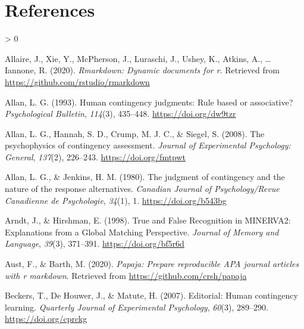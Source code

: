 \documentclass[
  english,
  man,floatsintext]{apa6}
\newlength{\cslhangindent}
\newenvironment{CSLReferences}[2] %
 {%
  \setlength{\parindent}{0pt}
  \ifodd #1 \everypar{\setlength{\hangindent}{\cslhangindent}}\ignorespaces\fi
  \ifnum #2 > 0
  \setlength{\parskip}{#2\baselineskip}
  \fi
 }%
 {}
\begin{document}
\newpage

\hypertarget{references}{%
\section{References}\label{references}}

\begingroup
\setlength{\parindent}{-0.5in}
\setlength{\leftskip}{0.5in}

\hypertarget{refs}{}
\begin{CSLReferences}{1}{0}
\leavevmode\hypertarget{ref-R-rmarkdown}{}%
Allaire, J., Xie, Y., McPherson, J., Luraschi, J., Ushey, K., Atkins, A., \ldots{} Iannone, R. (2020). \emph{Rmarkdown: Dynamic documents for r}. Retrieved from \url{https://github.com/rstudio/rmarkdown}

\leavevmode\hypertarget{ref-allanHumanContingencyJudgments1993}{}%
Allan, L. G. (1993). Human contingency judgments: {Rule} based or associative? \emph{Psychological Bulletin}, \emph{114}(3), 435--448. \url{https://doi.org/dw9tzr}

\leavevmode\hypertarget{ref-allanPsychophysicsContingencyAssessment2008}{}%
Allan, L. G., Hannah, S. D., Crump, M. J. C., \& Siegel, S. (2008). The psychophysics of contingency assessment. \emph{Journal of Experimental Psychology: General}, \emph{137}(2), 226--243. \url{https://doi.org/fmtpwt}

\leavevmode\hypertarget{ref-allanJudgmentContingencyNature1980}{}%
Allan, L. G., \& Jenkins, H. M. (1980). The judgment of contingency and the nature of the response alternatives. \emph{Canadian Journal of Psychology/Revue Canadienne de Psychologie}, \emph{34}(1), 1. \url{https://doi.org/b543bg}

\leavevmode\hypertarget{ref-arndtTrueFalseRecognition1998}{}%
Arndt, J., \& Hirshman, E. (1998). True and {False Recognition} in {MINERVA2}: {Explanations} from a {Global Matching Perspective}. \emph{Journal of Memory and Language}, \emph{39}(3), 371--391. \url{https://doi.org/bf5r6d}

\leavevmode\hypertarget{ref-R-papaja}{}%
Aust, F., \& Barth, M. (2020). \emph{Papaja: Prepare reproducible APA journal articles with r markdown}. Retrieved from \url{https://github.com/crsh/papaja}

\leavevmode\hypertarget{ref-beckersEditorialHumanContingency2007}{}%
Beckers, T., De Houwer, J., \& Matute, H. (2007). Editorial: {Human} contingency learning. \emph{Quarterly Journal of Experimental Psychology}, \emph{60}(3), 289--290. \url{https://doi.org/cprckg}


\end{CSLReferences}
\end{document}
